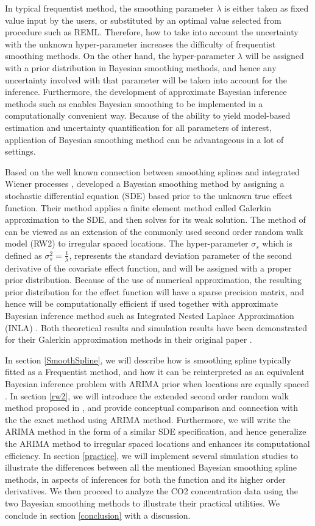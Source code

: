 \documentclass{article}
\begin{document}
In typical frequentist method, the smoothing parameter $\lambda$ is either taken as fixed value input by the users, or substituted by an optimal value selected from procedure such as REML. Therefore, how to take into account the uncertainty with the unknown hyper-parameter increases the difficulty of frequentist smoothing methods. On the other hand, the hyper-parameter $\lambda$ will be assigned with a prior distribution in Bayesian smoothing methods, and hence any uncertainty involved with that parameter will be taken into account for the inference. Furthermore, the development of approximate Bayesian inference methods such as \cite{inla} enables Bayesian smoothing to be implemented in a computationally convenient way. Because of the ability to yield model-based estimation and uncertainty quantification for all parameters of interest, application of Bayesian smoothing method can be advantageous in a lot of settings.


Based on the well known connection between smoothing splines and integrated Wiener processes \citep{wahba}, \cite{rw2} developed a Bayesian smoothing method by assigning a stochastic differential equation (SDE) based prior to the unknown true effect function. 
Their method applies a finite element method called Galerkin approximation to the SDE, and then solves for its weak solution. The method of \cite{inla} can be viewed as an extension of the commonly used second order random walk model (RW2) to irregular spaced locations.
The hyper-parameter $\sigma_s$ which is defined as $\sigma_s^2 = \frac{1}{ \lambda}$, represents the standard deviation parameter of the second derivative of the covariate effect function, and will be assigned with a proper prior distribution. Because of the use of numerical approximation, the resulting prior distribution for the effect function will have a sparse precision matrix, and hence will be computationally efficient if used together with approximate Bayesian inference method such as Integrated Nested Laplace Approximation (INLA) \citep{inla}. Both theoretical results and simulation results have been demonstrated for their Galerkin approximation methods in their original paper \citep{rw2}.


In section \ref{SmoothSpline}, we will describe how is smoothing spline typically fitted as a Frequentist method, and how it can be reinterpreted as an equivalent Bayesian inference problem with ARIMA prior when locations are equally spaced \citep{ARIMA}. In section \ref{rw2}, we will introduce the extended second order random walk method proposed in \cite{rw2}, and provide conceptual comparison and connection with the the exact method using ARIMA method. Furthermore, we will write the ARIMA method in the form of a similar SDE specification, and hence generalize the ARIMA method to irregular spaced locations and enhances its computational efficiency. In section \ref{practice}, we will implement several simulation studies to illustrate the differences between all the mentioned Bayesian smoothing spline methods, in aspects of inferences for both the function and its higher order derivatives. We then proceed to analyze the CO2 concentration data using the two Bayesian smoothing methods to illustrate their practical utilities. We conclude in section \ref{conclusion} with a discussion.
\end{document}
